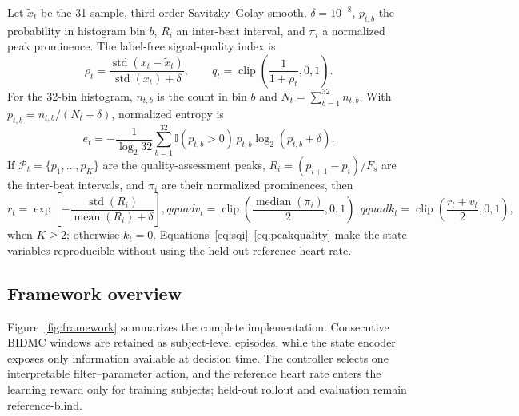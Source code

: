 \documentclass{elektr}
\begin{document}
Let $\widetilde{x}_t$ be the 31-sample, third-order Savitzky--Golay smooth, $\delta=10^{-8}$, $p_{t,b}$ the probability in histogram bin $b$, $R_i$ an inter-beat interval, and $\pi_i$ a normalized peak prominence. The label-free signal-quality index is
\begin{equation}
 \rho_t=\frac{\operatorname{std}(x_t-\widetilde{x}_t)}{\operatorname{std}(x_t)+\delta},
 \qquad
 q_t=\operatorname{clip}\!\left(\frac{1}{1+\rho_t},0,1\right).
 \label{eq:sqi}
\end{equation}
For the 32-bin histogram, $n_{t,b}$ is the count in bin $b$ and $N_t=\sum_{b=1}^{32}n_{t,b}$. With $p_{t,b}=n_{t,b}/(N_t+\delta)$, normalized entropy is
\begin{equation}
 e_t=-\frac{1}{\log_2 32}\sum_{b=1}^{32}\mathbb{I}(p_{t,b}>0)\,p_{t,b}\log_2(p_{t,b}+\delta).
 \label{eq:entropy}
\end{equation}
If $\mathcal{P}_t=\{p_1,\ldots,p_K\}$ are the quality-assessment peaks, $R_i=(p_{i+1}-p_i)/F_s$ are the inter-beat intervals, and $\pi_i$ are their normalized prominences, then
\begin{equation}
 r_t=\exp\!\left[-\frac{\operatorname{std}(R_i)}{\operatorname{mean}(R_i)+\delta}\right],qquad
 v_t=\operatorname{clip}\!\left(\frac{\operatorname{median}(\pi_i)}{2},0,1\right),qquad
 k_t=\operatorname{clip}\!\left(\frac{r_t+v_t}{2},0,1\right),
 \label{eq:peakquality}
\end{equation}
when $K\geq2$; otherwise $k_t=0$. Equations~\ref{eq:sqi}--\ref{eq:peakquality} make the state variables reproducible without using the held-out reference heart rate.

\subsection{Framework overview}

Figure~\ref{fig:framework} summarizes the complete implementation. Consecutive BIDMC windows are retained as subject-level episodes, while the state encoder exposes only information available at decision time. The controller selects one interpretable filter--parameter action, and the reference heart rate enters the learning reward only for training subjects; held-out rollout and evaluation remain reference-blind.
\end{document}
